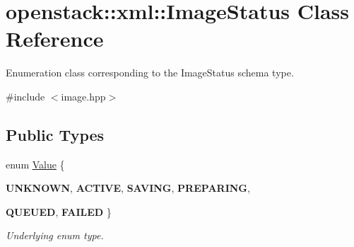 \hypertarget{classopenstack_1_1xml_1_1ImageStatus}{
\section{openstack::xml::ImageStatus Class Reference}
\label{classopenstack_1_1xml_1_1ImageStatus}
}


Enumeration class corresponding to the ImageStatus schema type.  




{\ttfamily \#include $<$image.hpp$>$}

\subsection*{Public Types}
\begin{DoxyCompactItemize}
\item 
enum \hyperlink{classopenstack_1_1xml_1_1ImageStatus_a188550ace9b21da799469c453a76c0d1}{Value} \{ \par
{\bfseries UNKNOWN}, 
{\bfseries ACTIVE}, 
{\bfseries SAVING}, 
{\bfseries PREPARING}, 
\par
{\bfseries QUEUED}, 
{\bfseries FAILED}
 \}
\begin{DoxyCompactList}\small\item\em Underlying enum type. \item\end{DoxyCompactList}\end{DoxyCompactItemize}
